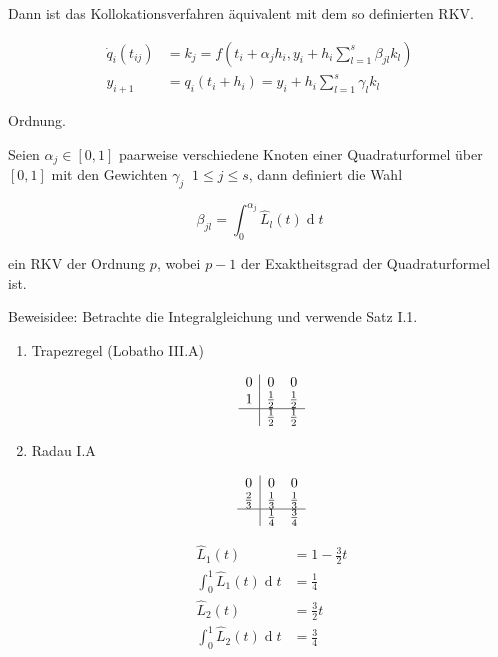 Dann ist das Kollokationsverfahren äquivalent mit dem so definierten RKV.

\begin{align*}
	\dot{q}_i(t_{ij}) &= k_j = f(t_i + \alpha_j h_i, y_i + h_i \sum_{l=1}^s \beta_{jl} k_l)\\
	y_{i+1} &= q_i(t_i + h_i) = y_i + h_i \sum_{l=1}^s \gamma_l k_l
\end{align*}


\begin{theorem}[Satz IV.7] Ordnung.

	Seien $\alpha_j \in [0, 1]$ paarweise verschiedene Knoten einer Quadraturformel über $[0,1]$ mit den Gewichten $\gamma_j\;\;1 \le j \le s$, dann definiert die Wahl 

	$$\beta_{jl} = \displaystyle\int_0^{\alpha_j}\!\hat{L}_l(t) \operatorname{d}t$$

	ein RKV der Ordnung $p$, wobei $p-1$ der Exaktheitsgrad der Quadraturformel ist.
\end{theorem}

Beweisidee: Betrachte die Integralgleichung und verwende Satz I.1.

\begin{example}\*
	\begin{enumerate}
		\item Trapezregel (Lobatho III.A)
		
			$$\begin{array}{c|cc}
				0 & 0 & 0\\
				1 & \frac{1}{2} & \frac{1}{2}\\
				\hline
				  & \frac{1}{2} & \frac{1}{2}
			\end{array}$$
		\item Radau I.A
		
			$$\begin{array}{c|cc}
				0 & 0 & 0\\
				\frac{2}{3} & \frac{1}{3} & \frac{1}{3}\\
				\hline
				  & \frac{1}{4} & \frac{3}{4}
			\end{array}$$

			\begin{align*}
				\hat{L}_1(t) &= 1 - \frac{3}{2}t\\
				\int_0^1\!\hat{L}_1(t) \operatorname{d}t &= \frac{1}{4}\\
				\hat{L}_2(t) &= \frac{3}{2}t\\
				\int_0^1\!\hat{L}_2(t) \operatorname{d}t &= \frac{3}{4}\\
			\end{align*}
			
	\end{enumerate}
\end{example}

